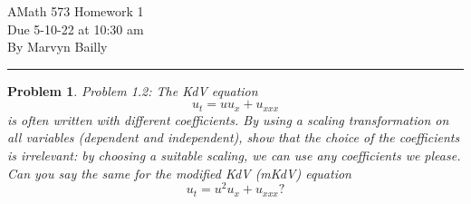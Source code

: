 \documentclass[12pt]{report}
\newtheorem{problem}{Problem}
\begin{document}
\large

\begin{center}
 AMath 573 Homework 1\\
 Due 5-10-22 at 10:30 am\\
 By Marvyn Bailly\\
\end{center}

\normalsize

\hrule



\begin{problem}
    Problem 1.2: The KdV equation
    $$u_t = uu_x + u_{xxx}$$
    is often written with different coefficients. By using a scaling transformation on all variables (dependent and independent), show that the choice of the coefficients is irrelevant: by choosing a suitable scaling, we can use any coefficients we please. Can you say the same for the modified KdV (mKdV) equation
    $$u_t = u^2u_x + u_{xxx}?$$   
\end{problem}
\end{document}
